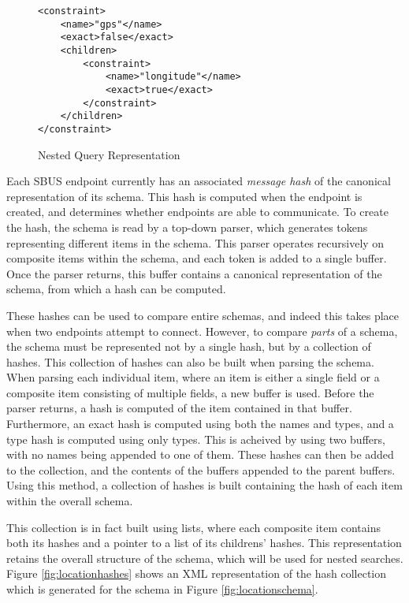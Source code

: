 \documentclass[12pt,twoside,notitlepage]{report}
\begin{document}

\begin{figure}[tbh]
\begin{lstlisting}
<constraint>
	<name>"gps"</name>
	<exact>false</exact>
	<children>
		<constraint>
			<name>"longitude"</name>
			<exact>true</exact>
		</constraint>
	</children>
</constraint>
\end{lstlisting}
\caption{Nested Query Representation}
\label{fig:nested_query}
\end{figure}

Each SBUS endpoint currently has an associated {\sl message hash} of the canonical representation of its schema. 
This hash is computed when the endpoint is created, and determines whether endpoints are able to communicate. 
To create the hash, the schema is read by a top-down parser, which generates tokens representing different items in the schema. 
This parser operates recursively on composite items within the schema, and each token is added to a single buffer. 
Once the parser returns, this buffer contains a canonical representation of the schema, from which a hash can be computed. 

These hashes can be used to compare entire schemas, and indeed this takes place when two endpoints attempt to connect. 
However, to compare {\sl parts} of a schema, the schema must be represented not by a single hash, but by a collection of hashes. 
This collection of hashes can also be built when parsing the schema. 
When parsing each individual item, where an item is either a single field or a composite item consisting of multiple fields, a new buffer is used. 
Before the parser returns, a hash is computed of the item contained in that buffer. 
Furthermore, an exact hash is computed using both the names and types, and a type hash is computed using only types. 
This is acheived by using two buffers, with no names being appended to one of them. 
These hashes can then be added to the collection, and the contents of the buffers appended to the parent buffers. 
Using this method, a collection of hashes is built containing the hash of each item within the overall schema. 

This collection is in fact built using lists, where each composite item contains both its hashes and a pointer to a list of its childrens' hashes.
This representation retains the overall structure of the schema, which will be used for nested searches. 
Figure \ref{fig:locationhashes} shows an XML representation of the hash collection which is generated for the schema in Figure \ref{fig:locationschema}.
\end{document}
